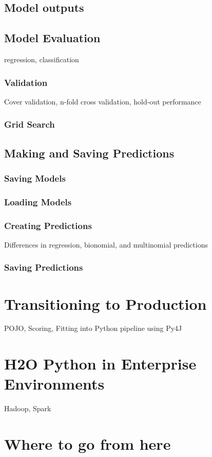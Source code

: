 \subsection{Model outputs}
\subsection{Model Evaluation}
regression, classification
\subsubsection{Validation}
Cover validation, n-fold cross validation, hold-out performance
\subsubsection{Grid Search}

\subsection{Making and Saving Predictions}
\subsubsection{Saving Models}
\subsubsection{Loading Models}
\subsubsection{Creating Predictions}
Differences in regression, bionomial, and multinomial predictions
\subsubsection{Saving Predictions}


\section{Transitioning to Production}
POJO, Scoring, Fitting into Python pipeline using Py4J


\section{H2O Python in Enterprise Environments}
Hadoop, Spark

\section{Where to go from here}


